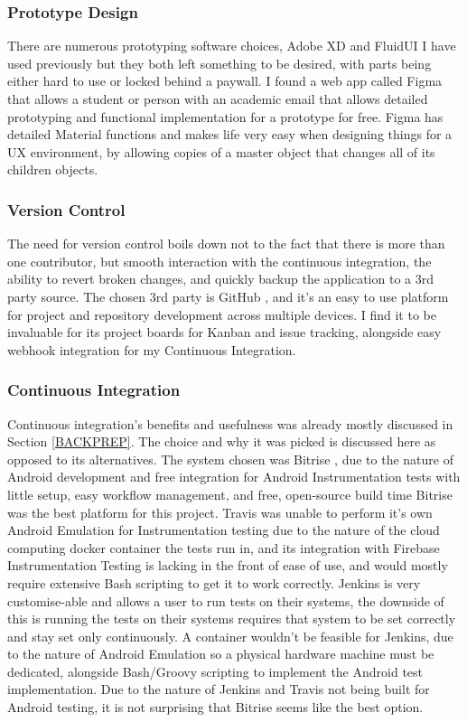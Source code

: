 \subsubsection{Prototype Design}

There are numerous prototyping software choices, Adobe XD \cite{ADOBEXD} and FluidUI \cite{FLUIDUI} I have used previously but they both left something to be desired, with parts being either hard to use or locked behind a paywall. I found a web app called Figma \cite{FIGMA} that allows a student or person with an academic email that allows detailed prototyping and functional implementation for a prototype for free. Figma has detailed Material functions and makes life very easy when designing things for a UX environment, by allowing copies of a master object that changes all of its children objects.

\subsubsection{Version Control}
The need for version control boils down not to the fact that there is more than one contributor, but smooth interaction with the continuous integration,  the ability to revert broken changes, and quickly backup the application to a 3rd party source. The chosen 3rd party is GitHub \cite{GITHUB}, and it's an easy to use platform for project and repository development across multiple devices. I find it to be invaluable for its project boards for Kanban and issue tracking, alongside easy webhook integration for my Continuous Integration.

\subsubsection{Continuous Integration} \label{CI}
Continuous integration's benefits and usefulness was already mostly discussed in Section \ref{BACKPREP}. The choice and why it was picked is discussed here as opposed to its alternatives. The system chosen was Bitrise \cite{BITRISE}, due to the nature of Android development and free integration for Android Instrumentation tests with little setup, easy workflow management, and free, open-source build time Bitrise was the best platform for this project. Travis \cite{TRAVIS} was unable to perform it's own Android Emulation for Instrumentation testing due to the nature of the cloud computing docker container the tests run in, and its integration with Firebase Instrumentation Testing is lacking in the front of ease of use, and would mostly require extensive Bash scripting to get it to work correctly. Jenkins \cite{JENKINS} is very customise-able and allows a user to run tests on their systems, the downside of this is running the tests on their systems requires that system to be set correctly and stay set only continuously. A container wouldn't be feasible for Jenkins, due to the nature of Android Emulation so a physical hardware machine must be dedicated, alongside Bash/Groovy scripting to implement the Android test implementation. Due to the nature of Jenkins and Travis not being built for Android testing, it is not surprising that Bitrise seems like the best option.

